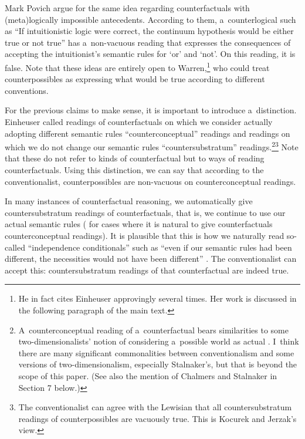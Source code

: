 \begin{artengenv}{Mark Povich}
\parencite*[][]{kocurek_counterlogicals_2021} %
 argue for the same idea regarding counterfactuals with (meta)logically impossible antecedents. According to them, a~counterlogical such as ``If intuitionistic logic were correct, the continuum hypothesis would be either true or not true'' has a~non-vacuous reading that expresses the consequences of accepting the intuitionist's semantic rules for ‘or' and ‘not'. On this reading, it is false. Note that these ideas are entirely open to Warren,\footnote{He in fact cites Einheuser approvingly several times. Her work is discussed in the following paragraph of the main text.} who could treat counterpossibles as expressing what would be true according to different conventions.

For the previous claims to make sense, it is important to introduce a~distinction. Einheuser
\parencite*[][]{einheuser_toward_2011} %
 called readings of counterfactuals on which we consider actually adopting different semantic rules ``counterconceptual'' readings and readings on which we do not change our semantic rules ``countersubstratum'' readings.\footnote{A~counterconceptual reading of a~counterfactual bears similarities to some two-dimensionalists' notion of considering a~possible world as actual 
\parencite[][]{stalnaker_considering_2001}. %
 I~think there are many significant commonalities between conventionalism and some versions of two-dimensionalism, especially Stalnaker's, but that is beyond the scope of this paper. (See also the mention of Chalmers and Stalnaker in Section 7 below.)}\footnote{The conventionalist can agree with the Lewisian that all countersubstratum readings of counterpossibles are vacuously true. This is Kocurek and Jerzak's view.} Note that these do not refer to kinds of counterfactual but to ways of reading counterfactuals. Using this distinction, we can say that according to the conventionalist, counterpossibles are non-vacuous on counterconceptual readings.

In many instances of counterfactual reasoning, we automatically give countersubstratum readings of counterfactuals, that is, we continue to use our actual semantic rules
(\cites[][]{kripke_naming_1980}[][]{wright_defence_1985}[but see][]{kocurek_against_2020} for cases where it is natural to give counterfactuals counterconceptual readings). %
 It is plausible that this is how we naturally read so-called ``independence conditionals'' such as ``even if our semantic rules had been different, the necessities would not have been different'' 
\parencites[][]{thomasson_modal_2007}[see also][]{sidelle_conventionalism_2009}[][]{thomasson_norms_2020}. %
 The conventionalist can accept this: countersubstratum readings of that counterfactual are indeed true.


\end{artengenv}

